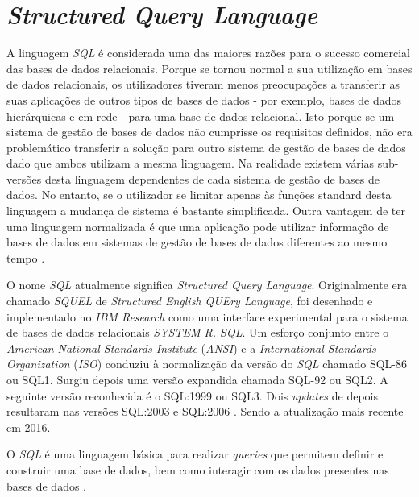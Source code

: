\documentclass[11pt,twoside,a4paper]{report}
\begin{document}
\section{\textit{Structured Query Language}}
A linguagem \textit{SQL} é considerada uma das maiores razões para o sucesso comercial das bases de dados relacionais. Porque se tornou normal a sua utilização em bases de dados relacionais, os utilizadores tiveram menos preocupações a transferir as suas aplicações de outros tipos de bases de dados - por exemplo, bases de dados hierárquicas e em rede - para uma base de dados relacional. Isto porque se um sistema de gestão de bases de dados não cumprisse os requisitos definidos, não era problemático transferir a solução para outro sistema de gestão de bases de dados dado que ambos utilizam a mesma linguagem. Na realidade existem várias sub-versões desta linguagem dependentes de cada sistema de gestão de bases de dados. No entanto, se o utilizador se limitar apenas às funções standard desta linguagem a mudança de sistema é bastante simplificada. Outra vantagem de ter uma linguagem normalizada é que uma aplicação pode utilizar informação de bases de dados em sistemas de gestão de bases de dados diferentes ao mesmo tempo \cite{Elmasri:2010:FDS:1855347}.\par 
O nome \textit{SQL} atualmente significa \textit{Structured Query Language}. Originalmente era chamado \textit{SQUEL} de \textit{Structured English QUEry Language}, foi desenhado e implementado no \textit{IBM Research} como uma interface experimental para o sistema de bases de dados relacionais \textit{SYSTEM R. SQL}. Um esforço conjunto entre o \textit{American National Standards Institute} (\textit{ANSI}) e a \textit{International Standards Organization} (\textit{ISO}) conduziu à normalização da versão do \textit{SQL} chamado SQL-86 ou SQL1. Surgiu depois uma versão expandida chamada SQL-92 ou SQL2. A seguinte versão reconhecida é o SQL:1999 ou SQL3. Dois \textit{updates} de depois resultaram nas versões SQL:2003 e SQL:2006  \cite{Elmasri:2010:FDS:1855347}. Sendo a atualização mais recente em 2016.\par 
O \textit{SQL} é uma linguagem básica para realizar \textit{queries} que permitem definir e construir uma base de dados, bem como interagir com os dados presentes nas bases de dados \cite{Elmasri:2010:FDS:1855347}.
\end{document}
